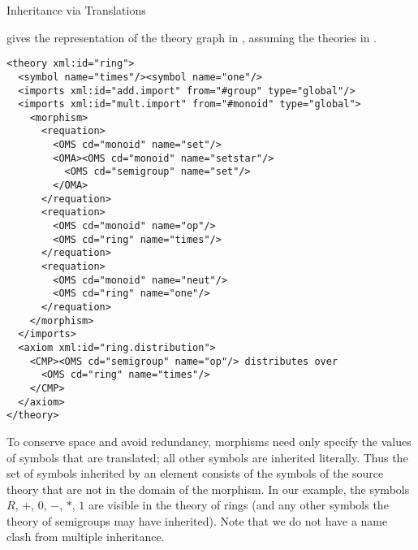 \begin{omgroup}[id=complex-theories,short=Complex Theories,
                            creators=miko,contributors=frabe]
\begin{omgroup}[id=morphisms]{Inheritance via Translations}
\begin{module}[id=morphisms]
{} gives the \omdoc representation of the theory graph in
{}, assuming the theories in {}.

\begin{lstlisting}[label=lst:rings,
  caption={A Theory of Rings by Inheritance Via Renaming},
  index={derive,method,premise}]
<theory xml:id="ring"> 
  <symbol name="times"/><symbol name="one"/> 
  <imports xml:id="add.import" from="#group" type="global"/>
  <imports xml:id="mult.import" from="#monoid" type="global"> 
    <morphism> 
      <requation> 
        <OMS cd="monoid" name="set"/>
        <OMA><OMS cd="monoid" name="setstar"/>
          <OMS cd="semigroup" name="set"/>
        </OMA>
      </requation> 
      <requation> 
        <OMS cd="monoid" name="op"/>
        <OMS cd="ring" name="times"/>
      </requation> 
      <requation>
        <OMS cd="monoid" name="neut"/>
        <OMS cd="ring" name="one"/>
      </requation> 
    </morphism> 
  </imports> 
  <axiom xml:id="ring.distribution"> 
    <CMP><OMS cd="semigroup" name="op"/> distributes over 
      <OMS cd="ring" name="times"/> 
    </CMP> 
  </axiom>
</theory>
\end{lstlisting}

To conserve space and avoid redundancy, \omdoc morphisms need only specify the values of
symbols that are translated; all other symbols are inherited literally.  Thus the set of
symbols inherited by an  element consists of the symbols of the source
theory that are not in the domain of the morphism. In our example, the symbols $R$, $+$,
$0$, $-$, $*$, $1$ are visible in the theory of rings (and any other symbols the theory of
semigroups may have inherited). Note that we do not have a name clash from multiple
inheritance.
  

\end{module}
\end{omgroup}
\end{omgroup}
